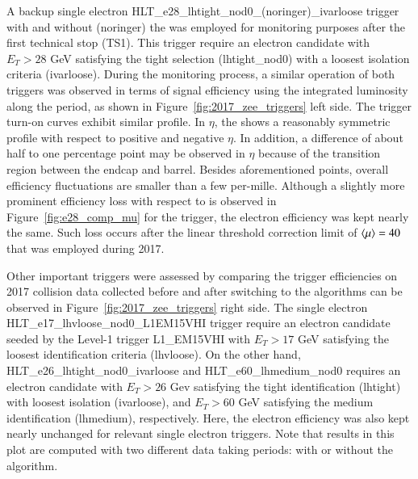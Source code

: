 A backup single electron HLT\_e28\_lhtight\_nod0\_(noringer)\_ivarloose trigger
 with and without (noringer) the \rnn{} was employed for monitoring purposes after the first technical stop (TS1).
This trigger require an electron candidate with $E_T > 28$ GeV satisfying the tight selection (lhtight\_nod0) with a loosest isolation criteria (ivarloose). During the monitoring process, a similar operation of both triggers was observed in terms of signal efficiency using the integrated luminosity along the period, as shown in Figure~\ref{fig:2017_zee_triggers} left side. The trigger
turn-on curves exhibit similar profile. In $\eta$, the \rnn{} shows a reasonably symmetric profile with respect to positive and negative $\eta$. In addition, a difference of about half to one percentage point may be observed in $\eta$ because of the transition region between the endcap and barrel. Besides aforementioned points, overall efficiency fluctuations are smaller than a few per-mille. Although a slightly more prominent efficiency loss with respect to
\avgmu{} is observed in Figure~\ref{fig:e28_comp_mu} for the \rnn{} trigger, the electron efficiency was kept nearly the same. Such loss occurs after the linear threshold correction limit of $\langle \mu \rangle=40$ that was employed during 2017.

Other important triggers were assessed by comparing the trigger efficiencies on 2017 collision data collected before and after switching to the \rnn{} algorithms can be observed in Figure~\ref{fig:2017_zee_triggers} right side. The single electron HLT\_e17\_lhvloose\_nod0\_L1EM15VHI trigger require an electron candidate seeded by the Level-1 trigger L1\_EM15VHI with $E_T > 17$ GeV satisfying the loosest identification criteria (lhvloose). On the other hand, HLT\_e26\_lhtight\_nod0\_ivarloose and HLT\_e60\_lhmedium\_nod0 requires an electron candidate with $E_T>26$ Gev satisfying the tight identification (lhtight) with loosest isolation (ivarloose), and $E_T>60$ GeV satisfying the medium identification (lhmedium), respectively. Here, the electron efficiency was also kept nearly unchanged for relevant single electron triggers. Note that results in
this plot are computed with two different data taking periods: with or without the \rnn{} algorithm. 




